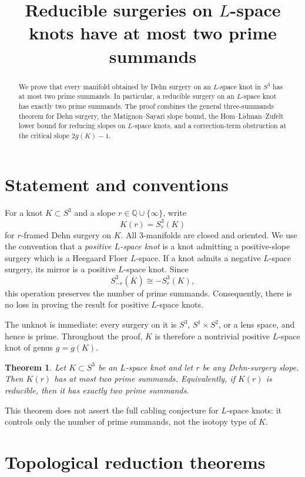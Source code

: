 \documentclass[11pt]{article}
\title{Reducible surgeries on \texorpdfstring{$L$}{L}-space knots have at
most two prime summands}
\author{}
\date{}
\newtheorem{theorem}{Theorem}[section]
\theoremstyle{definition}
\theoremstyle{remark}
\newcommand{\Sthree}{S^{3}}
\begin{document}
\maketitle

\begin{abstract}
We prove that every manifold obtained by Dehn surgery on an $L$-space knot
in $S^{3}$ has at most two prime summands.  In particular, a reducible
surgery on an $L$-space knot has exactly two prime summands.  The proof
combines the general three-summands theorem for Dehn surgery, the
Matignon--Sayari slope bound, the Hom--Lidman--Zufelt lower bound for
reducing slopes on $L$-space knots, and a correction-term obstruction at the
critical slope $2g(K)-1$.
\end{abstract}

\section{Statement and conventions}

For a knot $K\subset \Sthree$ and a slope $r\in \mathbb Q\cup\{\infty\}$,
write
\[
K(r)=\Sthree_r(K)
\]
for $r$-framed Dehn surgery on $K$.  All $3$-manifolds are closed and
oriented.  We use the convention that a \emph{positive $L$-space knot} is a
knot admitting a positive-slope surgery which is a Heegaard Floer $L$-space.
If a knot admits a negative $L$-space surgery, its mirror is a positive
$L$-space knot.  Since
\[
\Sthree_{-r}(\overline K)\cong -\Sthree_r(K),
\]
this operation preserves the number of prime summands.  Consequently, there
is no loss in proving the result for positive $L$-space knots.

The unknot is immediate: every surgery on it is $S^3$, $S^1\times S^2$, or a
lens space, and hence is prime.  Throughout the proof, $K$ is therefore a
nontrivial positive $L$-space knot of genus $g=g(K)$.

\begin{theorem}\label{thm:main}
Let $K\subset \Sthree$ be an $L$-space knot and let $r$ be any Dehn-surgery
slope.  Then $K(r)$ has at most two prime summands.  Equivalently, if
$K(r)$ is reducible, then it has exactly two prime summands.
\end{theorem}

This theorem does not assert the full cabling conjecture for $L$-space
knots: it controls only the number of prime summands, not the isotopy type
of $K$.

\section{Topological reduction theorems}
\end{document}
